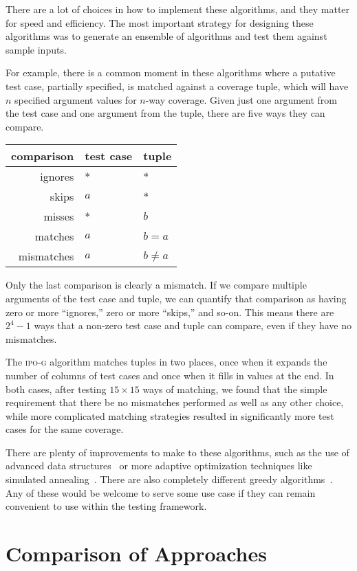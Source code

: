 \documentclass{juliacon}
\begin{document}
\vskip 6pt
There are a lot of choices in how to implement these algorithms, and they matter for speed and efficiency. The most important strategy for designing these algorithms was to generate an ensemble of algorithms and test them against sample inputs.

\vskip 6pt
For example, there is a common moment in these algorithms where a putative test case, partially specified, is matched against a coverage tuple, which will have $n$ specified argument values for $n$-way coverage. Given just one argument from the test case and one argument from the tuple, there are five ways they can compare.
\begin{center}
\begin{tabular}{rll}
comparison & test case & tuple \\ \hline
ignores & * & * \\
skips & $a$ & * \\
misses & * & $b$ \\
matches & $a$ & $b=a$ \\
mismatches & $a$ & $b\ne a$
\end{tabular}
\end{center}
Only the last comparison is clearly a mismatch. If we compare multiple arguments of the test case and tuple, we can quantify that comparison as having zero or more ``ignores,'' zero or more ``skips,'' and so-on. This means there are $2^4-1$ ways that a non-zero test case and tuple can compare, even if they have no mismatches.

\vskip 6pt
The \textsc{ipo-g} algorithm matches tuples in two places, once when it expands the number of columns of test cases and once when it fills in values at the end. In both cases, after testing $15\times 15$ ways of matching, we found that the simple requirement that there be no mismatches performed as well as any other choice, while more complicated matching strategies resulted in significantly more test cases for the same coverage.

\vskip 6pt
There are plenty of improvements to make to these algorithms, such as the use of advanced data structures~\cite{Segall2011-jv} or more adaptive optimization techniques like simulated annealing~\cite{Petke2015-ex}. There are also completely different greedy algorithms~\cite{Calvagna2012-ic,Koc2018-vs}. Any of these would be welcome to serve some use case if they can remain convenient to use within the testing framework.


\section{Comparison of Approaches}\label{sec:comparison}
\end{document}
